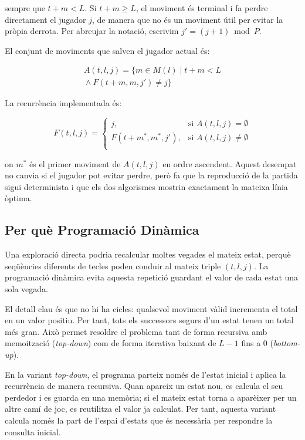 \documentclass[conference,compsoc]{IEEEtran}
\begin{document}
sempre que $t+m<L$. Si $t+m \geq L$, el moviment és terminal i fa perdre
directament el jugador $j$, de manera que no és un moviment útil per evitar la
pròpia derrota.
Per abreujar la notació, escrivim $j'=(j+1)\bmod P$.

El conjunt de moviments que salven el jugador actual és:

\begin{multline}
A(t,l,j)=\{m\in M(l)\mid t+m<L\\
{}\land F(t+m,m,j')\neq j\}
\end{multline}

La recurrència implementada és:

\begin{equation}
F(t,l,j)=
\begin{cases}
j,               & \text{si } A(t,l,j) = \emptyset\\
F(t+m^*,m^*,j'), & \text{si } A(t,l,j) \neq \emptyset\\
\end{cases}
\label{eq:recurrence}
\end{equation}

on $m^*$ és el primer moviment de $A(t,l,j)$ en ordre ascendent. Aquest desempat
no canvia si el jugador pot evitar perdre, però fa que la reproducció de la
partida sigui determinista i que els dos algorismes mostrin exactament la mateixa
línia òptima.

\subsection{Per què Programació Dinàmica}

Una exploració directa podria recalcular moltes vegades el mateix estat, perquè
seqüències diferents de tecles poden conduir al mateix triple $(t,l,j)$. La
programació dinàmica evita aquesta repetició guardant el valor de cada estat una
sola vegada.

El detall clau és que no hi ha cicles: qualsevol moviment vàlid incrementa el
total en un valor positiu. Per tant, tots els successors segurs d'un estat tenen
un total més gran. Això permet resoldre el problema tant de forma recursiva amb
memoització (\textit{top-down}) com de forma iterativa baixant de $L-1$ fins a $0$
(\textit{bottom-up}).

En la variant \textit{top-down}, el programa parteix només de l'estat inicial i
aplica la recurrència de manera recursiva. Quan apareix un estat nou, es calcula
el seu perdedor i es guarda en una memòria; si el mateix estat torna a aparèixer
per un altre camí de joc, es reutilitza el valor ja calculat. Per tant, aquesta
variant calcula només la part de l'espai d'estats que és necessària per respondre
la consulta inicial.
\end{document}
